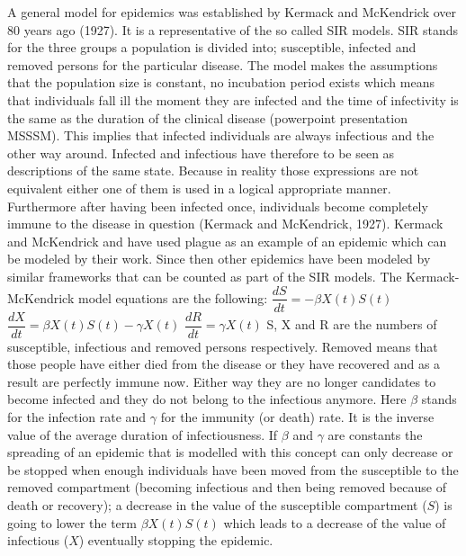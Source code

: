 \documentclass[11pt]{article}
\begin{document}
A general model for epidemics was established by Kermack and McKendrick over 80 years ago (1927). It is a representative of the so called SIR models. SIR stands for the three groups a population is divided into; susceptible, infected and removed persons for the particular disease. The model makes the assumptions that the population size is constant, no incubation period exists which means that individuals fall ill the moment they are infected and the time of infectivity is the same as the duration of the clinical disease (powerpoint presentation MSSSM). This implies that infected individuals are always infectious and the other way around. Infected and infectious have therefore to be seen as descriptions of the same state. Because in reality those expressions are not equivalent either one of them is used in a logical appropriate manner. Furthermore after having been infected once, individuals become completely immune to the disease in question (Kermack and McKendrick, 1927). Kermack and McKendrick and have used plague as an example of an epidemic which can be modeled by their work. Since then other epidemics have been modeled by similar frameworks that can be counted as part of the SIR models.
The Kermack-McKendrick model equations are the following:
\linebreak 
$ \dfrac{dS}{dt}=-\beta X(t)S(t) $
\linebreak 
$ \dfrac{dX}{dt}=\beta X(t)S(t)-\gamma X(t) $
\linebreak 
$ \dfrac{dR}{dt}=\gamma X(t) $
\linebreak 
S, X and R are the numbers of susceptible, infectious and removed persons respectively. Removed means that those people have either died from the disease or they have recovered and as a result are perfectly immune now. Either way they are no longer candidates to become infected and they do not belong to the infectious anymore.
\linebreak 
Here $\beta$ stands for the infection rate and $\gamma$ for the immunity (or death) rate. It is the inverse value of the average duration of infectiousness. If $\beta$ and $\gamma$ are constants the spreading of an epidemic that is modelled with this concept can only decrease or be stopped when enough individuals have been moved from the susceptible to the removed compartment (becoming infectious and then being removed because of death or recovery); a decrease in the value of the susceptible compartment ($ S $) is going to lower the term $\beta X(t)S(t)$ which leads to a decrease of the value of infectious ($ X $) eventually stopping the epidemic.
\end{document}
